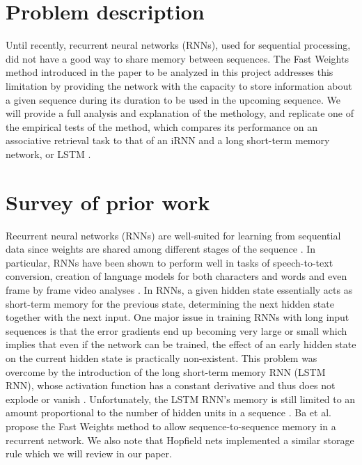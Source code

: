 \section{Problem description}

Until recently, recurrent neural networks (RNNs), used for sequential processing, did not have a good way to share memory between sequences.
The Fast Weights method introduced in the paper to be analyzed in this project \cite{DBLP:conf/nips/BaHMLI16} addresses this limitation by providing the network with the capacity to store information about a given sequence during its duration to be used in the upcoming sequence. We will provide a full analysis and explanation of the methology, and replicate one of the empirical tests of the method, which compares its performance on an associative retrieval task to that of an iRNN and a long short-term memory network, or LSTM \cite{DBLP:journals/neco/HochreiterS97}.

\section{Survey of prior work}

Recurrent neural networks (RNNs) are well-suited for learning from sequential data since weights are shared among different stages of the sequence \cite[p. 373]{Goodfellow-et-al-2016}. In particular, RNNs have been shown to perform well in tasks of speech-to-text conversion, creation of language models for both characters and words \cite{DBLP:conf/icml/SutskeverMH11} and even frame by frame video analyses \cite{mnih}. In RNNs, a given hidden state essentially acts as short-term memory for the previous state, determining the next hidden state together with the next input. One major issue in training RNNs with long input sequences is that the error gradients end up becoming very large or small \cite[p. 16]{DBLP:journals/nn/Schmidhuber15} which implies that even if the network can be trained, the effect of an early hidden state on the current hidden state is practically non-existent. This problem was overcome by the introduction of the long short-term memory RNN (LSTM RNN), whose activation function has a constant derivative and thus does not explode or vanish \cite[p. 19]{DBLP:journals/nn/Schmidhuber15}. Unfortunately, the LSTM RNN's memory is still limited to an amount proportional to the number of hidden units in a sequence \cite[p. 1]{DBLP:conf/nips/BaHMLI16}. Ba et al. propose the Fast Weights method to allow sequence-to-sequence memory in a recurrent network. We also note that Hopfield nets \cite{MacKay:2002:ITI:971143} implemented a similar storage rule \cite[p. 2]{DBLP:conf/nips/BaHMLI16} which we will review in our paper.

